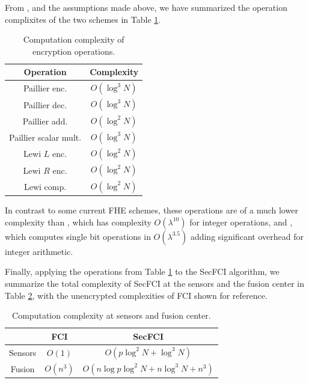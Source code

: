 \documentclass[letterpaper, 10 pt, journal, twoside]{ieeetran}  %
\begin{document}
From \cite{paillierPublicKeyCryptosystemsBased1999,lewiOrderRevealingEncryptionNew2016}, and the assumptions made above, we have summarized the operation complixites of the two schemes in Table \ref{tab:complex_ops}.
\begin{table}[tb]
   \centering
   \caption{Computation complexity of encryption operations.}
   \label{tab:complex_ops}
   \begin{tabular}{ |c|c| }
      \hline
      \textbf{Operation} & \textbf{Complexity} \\ 
      \hline
      Paillier enc. & $O(\log^3{N})$ \\ 
      Paillier dec. & $O(\log^3{N})$ \\ 
      Paillier add. & $O(\log^2{N})$ \\ 
      Paillier scalar mult. & $O(\log^3{N})$ \\ 
      Lewi $L$ enc. & $O(\log^2{N})$ \\ 
      Lewi $R$ enc. & $O(\log^2{N})$ \\ 
      Lewi comp. & $O(\log^2{N})$ \\ 
      \hline
   \end{tabular}
   \vspace{-5pt}
\end{table}
In contrast to some current FHE schemes, these operations are of a much lower complexity than \cite{vandijkFullyHomomorphicEncryption2010a}, which has complexity $O(\lambda^{10})$ for integer operations, and \cite{stehleFasterFullyHomomorphic2010}, which computes single bit operations in $O(\lambda^{3.5})$ adding significant overhead for integer arithmetic.

Finally, applying the operations from Table \ref{tab:complex_ops} to the SecFCI algorithm, we summarize the total complexity of SecFCI at the sensors and the fusion center in Table \ref{tab:complex}, with the unencrypted complexities of FCI shown for reference. 
\begin{table}[tb]
   \centering
   \caption{Computation complexity at sensors and fusion center.}
   \label{tab:complex}
   \begin{tabular}{ |c|c|c| }
      \hline
       & \textbf{FCI} & \textbf{SecFCI} \\ 
      \hline
      Sensors & $O(1)$ & $O\left(p\log^2{N} + \log^3{N}\right)$ \\ 
      Fusion & $O(n^3)$ & $O\left(n\log{p}\log^2{N} + n\log^3{N} + n^3\right)$ \\ 
      \hline
   \end{tabular}
\end{table}
\end{document}
